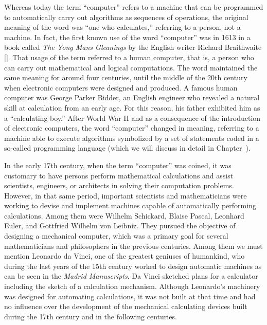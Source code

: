 {{{Whereas today the term ``computer'' refers to a machine that can be programmed to automatically carry out algorithms as sequences of operations, the original meaning of the word was ``one who calculates,'' referring to a person, not a machine. In fact, the  first known use of the word ``computer'' was in 1613 in a book called \textit{The Yong Mans Gleanings} by the English writer Richard Braithwaite [\citealt{chap:01:Brathwaite:1614}]. That usage of the term referred to a human computer, that is, a person who can carry out mathematical and logical computations. The word maintained the same meaning for around four centuries, until the middle of the 20th century when electronic computers\vadjust{\vspace*{-10pt}\pagebreak} were designed and produced. A famous human computer was George Parker Bidder, an English engineer who revealed a natural skill at calculation from an early age. For this reason, his father exhibited him as a ``calculating boy.'' After World War II and as a consequence of the introduction of electronic computers, the word ``computer'' changed in meaning, referring to a machine able to execute algorithms symbolized by a set of statements coded in a so-called programming language (which we will discuss in detail in Chapter~).

In the early 17th century, when the term ``computer'' was coined, it was customary to have persons perform mathematical calculations and assist scientists, engineers, or architects in solving their computation problems. However, in that same period, important scientists and mathematicians were working to devise and implement machines capable of automatically performing calculations. Among them were Wilhelm Schickard, Blaise Pascal, Leonhard Euler, and Gottfried Wilhelm von Leibniz. They pursued the objective of designing a mechanical computer, which was a primary goal for several mathematicians and philosophers in the previous centuries. Among them we must mention Leonardo da Vinci, one of the greatest geniuses of humankind, who during the last years of the 15th century worked to design automatic machines as can be seen in the \textit{Madrid Manuscripts}. Da Vinci sketched plans for a calculator including the sketch of a calculation mechanism. Although Leonardo's machinery was designed for automating calculations, it was not built at that time and had no influence over the development of the mechanical calculating devices built during the 17th century and in the following centuries.

}}}
